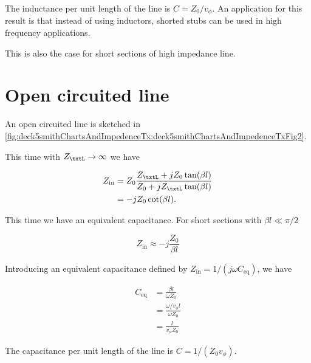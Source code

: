 The inductance per unit length of the line is \( C = Z_0/v_\phi \).  An application for this result is that instead of using inductors, shorted stubs can be used in high frequency applications.

This is also the case for short sections of high impedance line.

\section{Open circuited line}

An open circuited line is sketched in \cref{fig:deck5smithChartsAndImpedenceTx:deck5smithChartsAndImpedenceTxFig2}.


This time with \( Z_\txtL \rightarrow \infty \) we have

\begin{equation}\label{eqn:uwavesDeck5SmithChartCore:120}
\begin{aligned}
Z_{\textrm{in}}
&= Z_0 \frac{ Z_\txtL + j Z_0 \tan(\beta l) }{ Z_0 + j Z_\txtL \tan(\beta l)}
\\ &= -j Z_0 \cot(\beta l).
\end{aligned}
\end{equation}

This time we have an equivalent capacitance.  For short sections with \( \beta l \ll \pi/2 \)

\begin{equation}\label{eqn:uwavesDeck5SmithChartCore:140}
Z_{\textrm{in}}
\approx
-j \frac{Z_0}{\beta l}
\end{equation}

Introducing an equivalent capacitance defined by \( Z_{\textrm{in}} = 1/(j \omega C_{\mathrm{eq}}) \), we have

\begin{equation}\label{eqn:uwavesDeck5SmithChartCore:160}
\begin{aligned}
C_{\mathrm{eq}}
&=
\frac{ \beta l}{\omega Z_0}
\\ &=
\frac{ \omega/v_\phi l}{\omega Z_0}
\\ &=
\frac{ l}{v_\phi Z_0}
\end{aligned}
\end{equation}

The capacitance per unit length of the line is \( C = 1/(Z_0 v_\phi) \).

